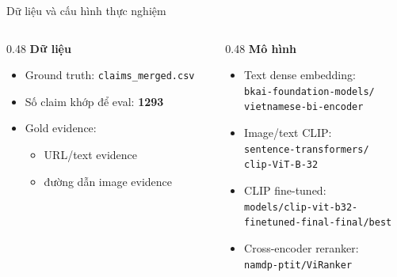 \documentclass[aspectratio=169]{beamer}
\begin{document}
\begin{frame}{Dữ liệu và cấu hình thực nghiệm}
  \begin{columns}[T,onlytextwidth]
    \begin{column}{0.48\textwidth}
      \textbf{Dữ liệu}
      \begin{itemize}
        \item Ground truth: \texttt{claims\_merged.csv}
        \item Số claim khớp để eval: \textbf{1293}
        \item Gold evidence:
        \begin{itemize}
          \item URL/text evidence
          \item đường dẫn image evidence
        \end{itemize}
      \end{itemize}
    \end{column}
    \begin{column}{0.48\textwidth}
      \textbf{Mô hình}
      \begin{itemize}\footnotesize
        \item Text dense embedding:\\
        \texttt{bkai-foundation-models/}\\
        \texttt{vietnamese-bi-encoder}
        \item Image/text CLIP:\\
        \texttt{sentence-transformers/}\\
        \texttt{clip-ViT-B-32}
        \item CLIP fine-tuned:\\
        \texttt{models/clip-vit-b32-}\\
        \texttt{finetuned-final-final/best}
        \item Cross-encoder reranker:\\
        \texttt{namdp-ptit/ViRanker}
      \end{itemize}
    \end{column}
  \end{columns}
\end{frame}
\end{document}
